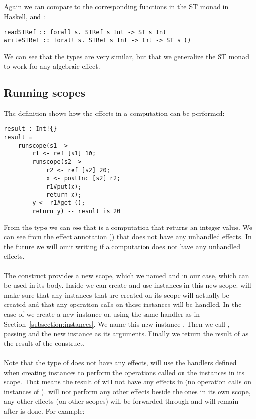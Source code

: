 Again we can compare to the corresponding functions in the ST monad in Haskell,  and :

\begin{verbatim}
readSTRef :: forall s. STRef s Int -> ST s Int
writeSTRef :: forall s. STRef s Int -> Int -> ST s ()
\end{verbatim}

We can see that the types are very similar, but that we generalize the ST monad to work for any algebraic effect.

\subsection{Running scopes}
The definition  shows how the effects in a computation can be performed:

\begin{verbatim}
result : Int!{}
result =
	runscope(s1 ->
		r1 <- ref [s1] 10;
		runscope(s2 ->
			r2 <- ref [s2] 20;
			x <- postInc [s2] r2;
			r1#put(x);
			return x);
		y <- r1#get ();
		return y) -- result is 20
\end{verbatim}

From the type we can see that  is a computation that returns an integer value.
We can see from the effect annotation (\ident{!{}}) that  does not have any unhandled effects.
In the future we will omit writing \ident{!{}} if a computation does not have any unhandled effects.
\\\\
The  construct provides a new scope, which we named  and  in our case, which can be used in its body.
Inside  we can create and use instances in this new scope.
 will make sure that any instances that are created on its scope will actually be created and that any operation calls on these instances will be handled.
In the case of  we create a new  instance on  using the same handler as in Section~\ref{subsection:instances}.
We name this new instance .
Then we call , passing  and the new instance as its arguments.
Finally we return the result of  as the result of the  construct.
\\\\
Note that the type of  does not have any effects,  will use the handlers defined when creating instances to perform the operations called on the instances in its scope.
That means the result of  will not have any effects in  (no operation calls on instances of ).
 will not perform any other effects beside the ones in its own scope, any other effects (on other scopes) will be forwarded through and will remain after  is done.
For example:

